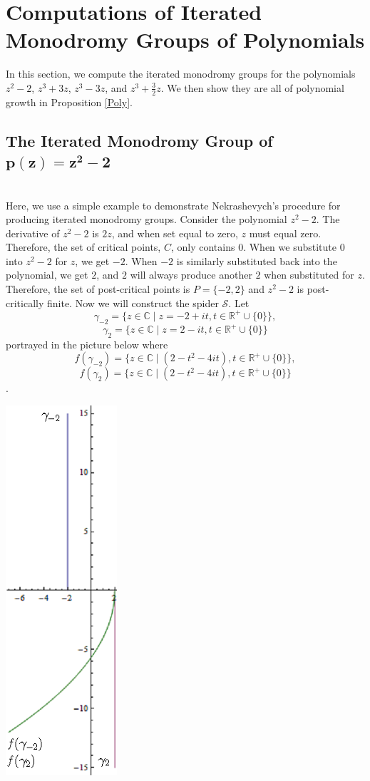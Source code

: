 \documentclass[11pt]{amsart}
\theoremstyle{definition}
\theoremstyle{remark}
\numberwithin{equation}{section}
\begin{document}
\section{Computations of Iterated Monodromy Groups of Polynomials}
\indent In this section, we compute the iterated monodromy groups for the polynomials $z^2-2$, $z^3+3z$, $z^3-3z$, and $z^3+\frac{3}{2}z$. We then show they are all of polynomial growth in Proposition \ref{Poly}.\\

\subsection{The Iterated Monodromy Group of $\mathbf{p(z)=z^2-2}$} \text{\space}\\
\indent Here, we use a simple example to demonstrate Nekrashevych's procedure for producing iterated monodromy groups. Consider the polynomial $z^2 - 2$. The derivative of $z^2 - 2$ is $2z$, and when set equal to zero, $z$ must equal zero. Therefore, the set of critical points, $C$, only contains $0$. When we substitute $0$ into $z^2 - 2$ for $z$, we get $-2$. When $-2$ is similarly substituted back into the polynomial, we get $2$, and $2$ will always produce another $2$ when substituted for $z$. Therefore, the set of post-critical points is $P = \{-2,2 \}$ and $z^2 - 2$ is post-critically finite. Now we will construct the spider $\mathcal{S}$. Let $$\gamma_{-2} = \{z \in \mathbb{C} \mid z = -2 + it, t \in \mathbb{R^+} \cup \{0\} \},$$ $$\gamma_2 = \{z \in \mathbb{C} \mid z = 2 - it, t \in \mathbb{R^+} \cup \{0\} \}$$ portrayed in the picture below where $$f(\gamma_{-2}) = \{z\in \mathbb{C} \mid (2 - t^2 - 4it), t \in \mathbb{R^+} \cup \{0\} \},$$ $$f(\gamma_2) =\{z\in \mathbb{C} \mid (2 - t^2 - 4it),t \in \mathbb{R^+} \cup \{0\} \}$$.\\

\begin{center}
\includegraphics[scale=0.5]{z2minus2spider.png}
\end{center}
\end{document}
